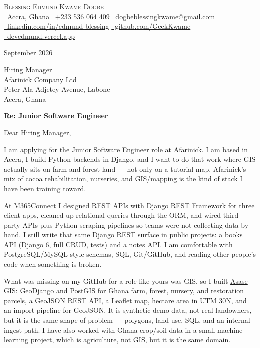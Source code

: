 \documentclass[letterpaper,11pt]{article}
\begin{document}
\begin{center}
  {\LARGE \scshape Blessing Edmund Kwame Dogbe}\\[6pt]
  \small
  \faMapMarker*\ Accra, Ghana \quad
  \faPhone\ +233 536 064 409 \quad
  \href{mailto:dogbeblessingkwame@gmail.com}{\faEnvelope\ dogbeblessingkwame@gmail.com}\\[3pt]
  \href{https://linkedin.com/in/edmund-blessing}{\faLinkedin\ linkedin.com/in/edmund-blessing} \quad
  \href{https://github.com/GeekKwame}{\faGithub\ github.com/GeekKwame} \quad
  \href{https://devedmund.vercel.app/}{\faGlobe\ devedmund.vercel.app}
\end{center}

\vspace{8pt}
 September 2026

\noindent Hiring Manager \\
Afarinick Company Ltd \\
Peter Ala Adjetey Avenue, Labone \\
Accra, Ghana

\textbf{Re: Junior Software Engineer}

Dear Hiring Manager,

I am applying for the Junior Software Engineer role at Afarinick. I am based in Accra, I build Python backends in Django, and I want to do that work where GIS actually sits on farm and forest land --- not only on a tutorial map. Afarinick's mix of cocoa rehabilitation, nurseries, and GIS/mapping is the kind of stack I have been training toward.

At M365Connect I designed REST APIs with Django REST Framework for three client apps, cleaned up relational queries through the ORM, and wired third-party APIs plus Python scraping pipelines so teams were not collecting data by hand. I still write that same Django REST surface in public projects: a books API (Django 6, full CRUD, tests) and a notes API. I am comfortable with PostgreSQL/MySQL-style schemas, SQL, Git/GitHub, and reading other people's code when something is broken.

What was missing on my GitHub for a role like yours was GIS, so I built \href{https://github.com/GeekKwame/asase-gis}{Asase GIS}: GeoDjango and PostGIS for Ghana farm, forest, nursery, and restoration parcels, a GeoJSON REST API, a Leaflet map, hectare area in UTM 30N, and an import pipeline for GeoJSON. It is synthetic demo data, not real landowners, but it is the same shape of problem --- polygons, land use, SQL, and an internal ingest path. I have also worked with Ghana crop/soil data in a small machine-learning project, which is agriculture, not GIS, but it is the same domain.
\end{document}
